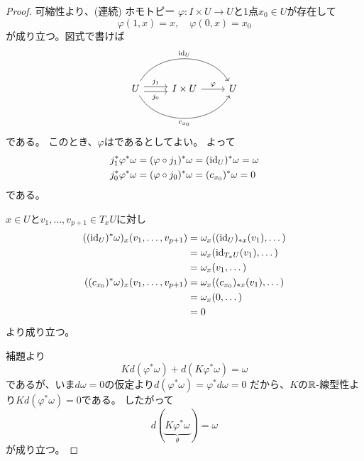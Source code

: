 \documentclass[report]{jlreq}
\begin{document}
\begin{proof}
    可縮性より、(連続) ホモトピー
    $\varphi \colon I \times U \to U$と1点$x_0 \in U$が存在して
    \begin{equation}
        \varphi(1, x) = x,
        \quad
        \varphi(0, x) = x_0
    \end{equation}
    が成り立つ。図式で書けば
    \begin{equation}
        \begin{tikzcd}[row sep=large]
            U \ar[shift left]{r}{j_1}
                \ar[shift right]{r}[swap]{j_0}
                \ar[bend left=60]{rr}{\id_U}
                \ar[bend right=60]{rr}[swap]{c_{x_0}}
                & I \times U \ar{r}{\varphi}
                & U
        \end{tikzcd}
    \end{equation}
    である。
    このとき、$\varphi$は{\smooth}であるとしてよい\footnotemark{}。
    よって
    \begin{alignat}{1}
        j_1^* \varphi^* \omega
            &= (\varphi \circ j_1)^* \omega
            = (\mathrm{id}_U)^* \omega
            = \omega \\
        j_0^* \varphi^* \omega
            &= (\varphi \circ j_0)^* \omega
            = (c_{x_0})^* \omega
            = 0
    \end{alignat}
    である。
    \begin{innerproof}
        $x \in U$と$v_1, \dots, v_{p + 1} \in T_xU$に対し
        \begin{alignat}{1}
            ((\mathrm{id}_U)^* \omega)_x (v_1, \dots, v_{p + 1})
                &= \omega_{x} ((\mathrm{id}_U)_{*x} (v_1), \dots) \\
                &= \omega_{x} (\mathrm{id}_{T_xU} (v_1), \dots) \\
                &= \omega_{x} (v_1, \dots) \\
            ((c_{x_0})^* \omega)_x (v_1, \dots, v_{p + 1})
                &= \omega_{x} ((c_{x_0})_{*x} (v_1), \dots) \\
                &= \omega_{x} (0, \dots) \\
                &= 0
        \end{alignat}
        より成り立つ。
    \end{innerproof}
    補題より
    \begin{equation}
        K d(\varphi^* \omega) + d(K \varphi^* \omega) = \omega
    \end{equation}
    であるが、いま$d\omega = 0$の仮定より$d(\varphi^* \omega) = \varphi^* d\omega = 0$
    だから、$K$の$\mathbb{R}$-線型性より$K d(\varphi^* \omega) = 0$である。
    したがって
    \begin{equation}
        d(\underbrace{K \varphi^* \omega}_{\theta}) = \omega
    \end{equation}
    が成り立つ。
\end{proof}
\end{document}

